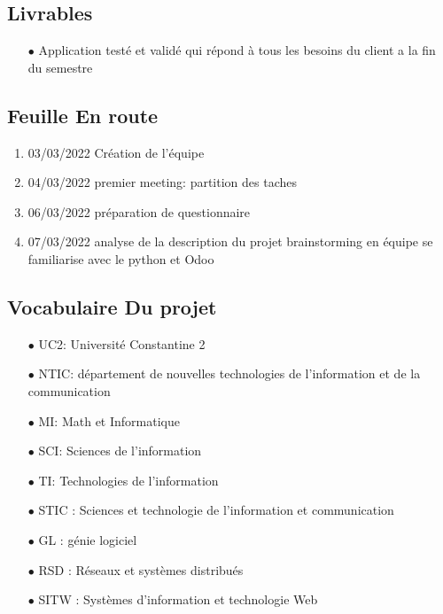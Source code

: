 \subsection{Livrables}
\begin{itemize}
    \item [$\bullet$]  Application testé et validé qui répond à tous les besoins du client a la fin du
          semestre
\end{itemize}

\subsection{Feuille En route}
\begin{enumerate}
    \item 03/03/2022 Création de l’équipe
    \item 04/03/2022 premier meeting: partition des taches
    \item 06/03/2022 préparation de questionnaire
    \item 07/03/2022 analyse de la description du projet brainstorming en équipe
          se familiarise avec le python et Odoo
\end{enumerate}

\subsection{Vocabulaire Du projet}
\begin{itemize}
    \item[$\bullet$] UC2\@: Université Constantine 2
    \item[$\bullet$] NTIC\@: département de nouvelles technologies de l’information et de la
        communication
    \item[$\bullet$] MI\@: Math et Informatique
    \item[$\bullet$] SCI\@: Sciences de l'information
    \item[$\bullet$] TI\@: Technologies de l'information
    \item[$\bullet$] STIC \@: Sciences et technologie de l’information et communication
    \item[$\bullet$] GL \@:  génie logiciel
    \item[$\bullet$] RSD \@: Réseaux et systèmes distribués
    \item[$\bullet$] SITW \@: Systèmes d'information et technologie Web
\end{itemize}

